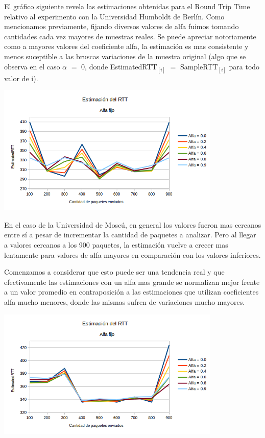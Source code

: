 El gráfico siguiente revela las estimaciones obtenidas para el Round Trip Time relativo al experimento con la Universidad Humboldt de Berlín. Como mencionamos previamente, fijando diversos valores de alfa fuimos tomando cantidades cada vez mayores de muestras reales. Se puede apreciar notoriamente como a mayores valores del coeficiente alfa, la estimación es mas consistente y menos suceptible a las bruscas variaciones de la muestra original (algo que se observa en el caso $\alpha$ $=$ $0$, donde EstimatedRTT$_{[i]}$ $=$ SampleRTT$_{[i]}$ para todo valor de i).

\centerline{\includegraphics[width=0.8\textwidth]{imagenes/3ra_parte/ping_varios_alfa_fijo_variando_n_alemania.png}}

En el caso de la Universidad de Moscú, en general los valores fueron mas cercanos entre sí a pesar de incrementar la cantidad de paquetes a analizar. Pero al llegar a valores cercanos a los 900 paquetes, la estimación vuelve a crecer mas lentamente para valores de alfa mayores en comparación con los valores inferiores. 

Comenzamos a considerar que esto puede ser una tendencia real y que efectivamente las estimaciones con un alfa mas grande se normalizan mejor frente a un valor promedio en contraposición a las estimaciones que utilizan coeficientes alfa mucho menores, donde las mismas sufren de variaciones mucho mayores.

\centerline{\includegraphics[width=0.8\textwidth]{imagenes/3ra_parte/ping_varios_alfa_fijo_variando_n_rusia.png}}

